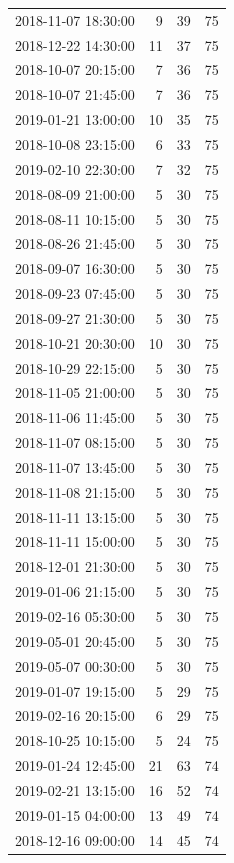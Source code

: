 \begin{tabular}{lrrr}
2018-11-07 18:30:00 & 9 & 39 & 75 \\
2018-12-22 14:30:00 & 11 & 37 & 75 \\
2018-10-07 20:15:00 & 7 & 36 & 75 \\
2018-10-07 21:45:00 & 7 & 36 & 75 \\
2019-01-21 13:00:00 & 10 & 35 & 75 \\
2018-10-08 23:15:00 & 6 & 33 & 75 \\
2019-02-10 22:30:00 & 7 & 32 & 75 \\
2018-08-09 21:00:00 & 5 & 30 & 75 \\
2018-08-11 10:15:00 & 5 & 30 & 75 \\
2018-08-26 21:45:00 & 5 & 30 & 75 \\
2018-09-07 16:30:00 & 5 & 30 & 75 \\
2018-09-23 07:45:00 & 5 & 30 & 75 \\
2018-09-27 21:30:00 & 5 & 30 & 75 \\
2018-10-21 20:30:00 & 10 & 30 & 75 \\
2018-10-29 22:15:00 & 5 & 30 & 75 \\
2018-11-05 21:00:00 & 5 & 30 & 75 \\
2018-11-06 11:45:00 & 5 & 30 & 75 \\
2018-11-07 08:15:00 & 5 & 30 & 75 \\
2018-11-07 13:45:00 & 5 & 30 & 75 \\
2018-11-08 21:15:00 & 5 & 30 & 75 \\
2018-11-11 13:15:00 & 5 & 30 & 75 \\
2018-11-11 15:00:00 & 5 & 30 & 75 \\
2018-12-01 21:30:00 & 5 & 30 & 75 \\
2019-01-06 21:15:00 & 5 & 30 & 75 \\
2019-02-16 05:30:00 & 5 & 30 & 75 \\
2019-05-01 20:45:00 & 5 & 30 & 75 \\
2019-05-07 00:30:00 & 5 & 30 & 75 \\
2019-01-07 19:15:00 & 5 & 29 & 75 \\
2019-02-16 20:15:00 & 6 & 29 & 75 \\
2018-10-25 10:15:00 & 5 & 24 & 75 \\
2019-01-24 12:45:00 & 21 & 63 & 74 \\
2019-02-21 13:15:00 & 16 & 52 & 74 \\
2019-01-15 04:00:00 & 13 & 49 & 74 \\
2018-12-16 09:00:00 & 14 & 45 & 74 \\

\end{tabular}
